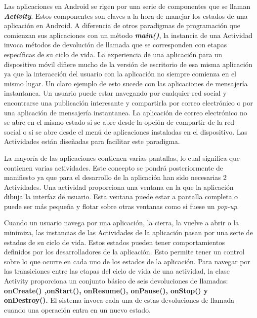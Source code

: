 Las aplicaciones en Android se rigen por una serie de componentes que se llaman \textbf{\textit{Activity}}. Estos componentes son claves a la hora de manejar los estados de una aplicaci\'on en Android. A diferencia de otros paradigmas de programaci\'on que comienzan sus aplicaciones con un m\'etodo \textbf{\textit{main()}}, la instancia de una Actividad invoca m\'etodos de devoluci\'on de llamada que se corresponden con etapas espec\'ificas de su ciclo de vida. La experiencia de una aplicaci\'on para un dispositivo m\'ovil difiere mucho de la versi\'on de escritorio de esa misma aplicaci\'on ya que la interacci\'on del usuario con la aplicaci\'on no siempre comienza en el mismo lugar. Un claro ejemplo de esto sucede con las aplicaciones de mensajer\'ia instantanea. Un usuario puede estar navegando por cualquier red social y encontrarse una publicaci\'on interesante y compartirla por correo electr\'onico o por una aplicaci\'on de mensajer\'ia instantanea. La aplicaci\'on de correo electr\'onico no se abre en el mismo estado si se abre desde la opci\'on de compartir de la red social o si se abre desde el men\'u de aplicaciones instaladas en el dispositivo. Las Actividades est\'an dise\~nadas para facilitar este paradigma.

La mayor\'ia de las aplicaciones contienen varias pantallas, lo cual significa que contienen varias actividades. Este concepto se pondr\'a posteriormente de manifiesto ya que para el desarrollo de la aplicaci\'on han sido necesarias 2 Actividades. Una actividad proporciona una ventana en la que la aplicaci\'on dibuja la interfaz de usuario. Esta ventana puede estar a pantalla completa o puede ser m\'as peque\~na y flotar sobre otras ventanas como si fuese un \textit{pop-up}.

Cuando un usuario navega por una aplicaci\'on, la cierra, la vuelve a abrir o la minimiza, las instancias de las Actividades de la aplicaci\'on pasan por una serie de estados de su ciclo de vida. Estos estados pueden tener comportamientos definidos por los desarrolladores de la aplicaci\'on. Esto permite tener un control sobre lo que ocurre en cada uno de los estados de la aplicaci\'on. Para navegar por las transiciones entre las etapas del ciclo de vida de una actividad, la clase Activity proporciona un conjunto b\'asico de seis devoluciones de llamadas: \textbf{onCreate() ,onStart(), onResume(), onPause(), onStop() y onDestroy().} El sistema invoca cada una de estas devoluciones de llamada cuando una operaci\'on entra en un nuevo estado.


